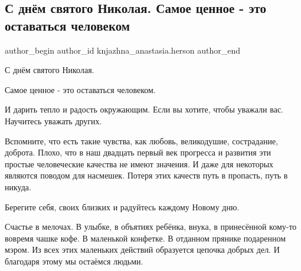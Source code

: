  
 
 
 
 
 
\subsection{С днём святого Николая. Самое ценное - это оставаться человеком}
\label{sec:19_12_2021.fb.knjazhna_anastasia.herson.1.den_svjatogo_nikolaja}
 
\ifcmt
 author_begin
   author_id knjazhna_anastasia.herson
 author_end
\fi

С днём святого Николая.

Самое ценное - это оставаться человеком.

И дарить тепло и радость окружающим. Если вы хотите, чтобы уважали вас.
Научитесь уважать других.


Вспомните, что есть такие чувства, как любовь, великодушие, сострадание,
доброта. Плохо, что в наш двадцать первый век прогресса и развития эти простые
человеческие качества не имеют значения. И даже для некоторых являются поводом
для насмешек. Потеря этих качеств путь в пропасть, путь  в никуда. 

Берегите себя, своих близких и радуйтесь каждому Новому дню.

Счастье в мелочах. В улыбке, в объятиях ребёнка, внука, в принесённой кому-то
вовремя чашке кофе. В маленькой конфетке. В отданном прянике подаренном мэром.
Из всех этих маленьких действий образуется цепочка добрых дел. И благодаря
этому мы остаёмся людьми.

